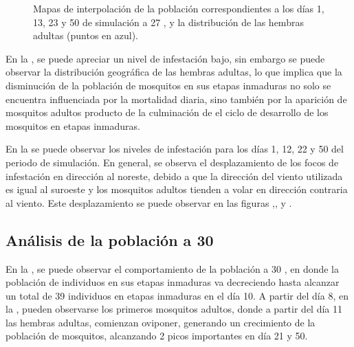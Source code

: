 \begin{figure}[!htbp]
    \caption{\label{fig:niveles-infestacion-27} Mapas de interpolación de la población correspondientes a los días 1, 13, 23 y 50 de simulación a 27 \textcelsius, y la distribución de las hembras adultas (puntos en azul). }
\end{figure}

En la , se puede apreciar un nivel de infestación bajo, sin
embargo se puede observar la distribución geográfica de las hembras adultas, lo que implica que la
disminución de la población de mosquitos en sus etapas inmaduras no solo se encuentra influenciada
por la mortalidad diaria, sino también por la aparición de mosquitos adultos producto de la culminación de el ciclo de desarrollo de los mosquitos en etapas inmaduras.

En la  se puede observar los niveles de infestación
para los días 1, 12, 22 y 50 del periodo de simulación. En general, se observa el
desplazamiento de los focos de infestación en dirección al noreste, debido a que la dirección del
viento utilizada es igual al suroeste y los mosquitos adultos tienden a volar en dirección
contraria al viento. Este desplazamiento se puede observar en las figuras
,,
 y .

\subsection{Análisis de la población a 30\textcelsius}
En la , se puede observar el comportamiento de la población a
30 \textcelsius, en donde la población de individuos en sus etapas inmaduras va decreciendo hasta
alcanzar un total de 39 individuos en etapas inmaduras en el día 10. A partir del día 8, en la
, pueden observarse los primeros mosquitos adultos, donde a
partir del día 11 las hembras adultas, comienzan oviponer, generando un crecimiento de la
población de mosquitos, alcanzando 2 picos importantes en día 21 y 50.

